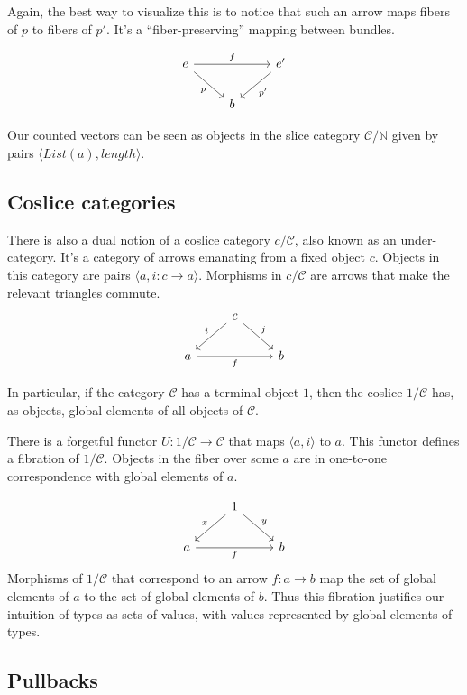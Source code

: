 \documentclass[DaoFP]{subfiles}
\begin{document}
Again, the best way to visualize this is to notice that such an arrow maps fibers of $p$ to fibers of $p'$. It's a ``fiber-preserving'' mapping between bundles.

\[
 \begin{tikzcd}
 e
 \arrow[rd, "p"']
 \arrow[rr, "f"]
 && e'
 \arrow[ld, "p'"]
 \\
 &b
  \end{tikzcd}
\]

Our counted vectors can be seen as objects in the slice category $\mathcal{C}/\mathbb{N}$ given by pairs $\langle \mathit{List}(a), \mathit{length} \rangle$.

\subsection{Coslice categories}

There is also a dual notion of a coslice category $c / \mathcal{C}$, also known as an under-category. It's a category of arrows emanating from a fixed object $c$. Objects in this category are pairs $\langle a, i \colon c \to a \rangle$. Morphisms in $c / \mathcal{C}$ are arrows that make the relevant  triangles commute.
\[
 \begin{tikzcd}
& c
 \arrow[rd, "j"]
 \arrow[ld, "i"']
 \\
a
\arrow[rr, "f"']
&& b
  \end{tikzcd}
\]

In particular, if the category $\mathcal{C}$ has a terminal object $1$, then the coslice $1 / \mathcal{C}$ has, as objects, global elements of all objects of $\mathcal{C}$. 

There is a forgetful functor $U \colon 1 / \mathcal{C} \to \mathcal{C}$ that maps $\langle a, i \rangle$ to $a$. This functor defines a fibration of $1 / \mathcal{C}$. Objects in the fiber over some $a$ are in one-to-one correspondence with global elements of $a$. 

\[
 \begin{tikzcd}
& 1
 \arrow[rd, "y"]
 \arrow[ld, "x"']
 \\
a
\arrow[rr, "f"']
&& b
  \end{tikzcd}
\]
Morphisms of $1/  \mathcal{C}$ that correspond to an arrow $f \colon a \to b$ map the set of global elements of $a$ to the set of global elements of $b$. Thus this fibration justifies our intuition of types as sets of values, with values represented by global elements of types. 

\subsection{Pullbacks}
\end{document}
